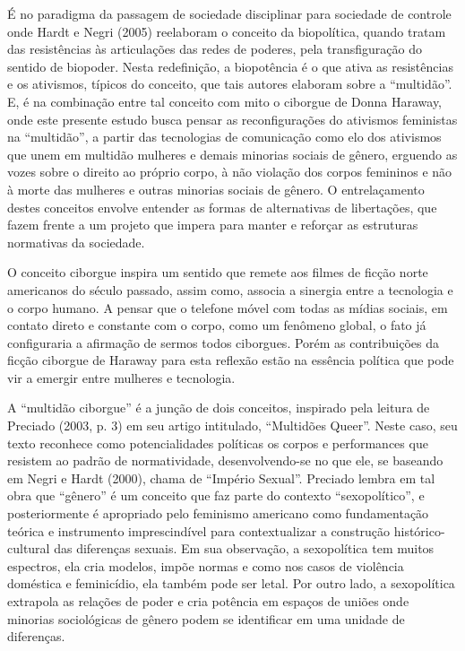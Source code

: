 É no paradigma da passagem de sociedade disciplinar para sociedade de
controle onde Hardt e Negri (2005) reelaboram o conceito da biopolítica,
quando tratam das resistências às articulações das redes de poderes,
pela transfiguração do sentido de biopoder. Nesta redefinição, a
biopotência é o que ativa as resistências e os ativismos, típicos do
conceito, que tais autores elaboram sobre a ``multidão''. E, é na
combinação entre tal conceito com mito o ciborgue de Donna Haraway, onde
este presente estudo busca pensar as reconfigurações do ativismos
feministas na ``multidão'', a partir das tecnologias de comunicação como
elo dos ativismos que unem em multidão mulheres e demais minorias
sociais de gênero, erguendo as vozes sobre o direito ao próprio corpo, à
não violação dos corpos femininos e não à morte das mulheres e outras
minorias sociais de gênero. O entrelaçamento destes conceitos envolve
entender as formas de alternativas de libertações, que fazem frente a um
projeto que impera para manter e reforçar as estruturas normativas da
sociedade.

O conceito ciborgue inspira um sentido que remete aos filmes de ficção
norte americanos do século passado, assim como, associa a sinergia entre
a tecnologia e o corpo humano. A pensar que o telefone móvel com todas
as mídias sociais, em contato direto e constante com o corpo, como um
fenômeno global, o fato já configuraria a afirmação de sermos todos
ciborgues. Porém as contribuições da ficção ciborgue de Haraway para
esta reflexão estão na essência política que pode vir a emergir entre
mulheres e tecnologia.

A ``multidão ciborgue'' é a junção de dois conceitos, inspirado pela
leitura de Preciado (2003, p. 3) em seu artigo intitulado, ``Multidões
Queer''. Neste caso, seu texto reconhece como potencialidades políticas
os corpos e performances que resistem ao padrão de normatividade,
desenvolvendo-se no que ele, se baseando em Negri e Hardt (2000), chama
de ``Império Sexual''. Preciado lembra em tal obra que ``gênero'' é um
conceito que faz parte do contexto ``sexopolítico'', e posteriormente é
apropriado pelo feminismo americano como fundamentação teórica e
instrumento imprescindível para contextualizar a construção
histórico-cultural das diferenças sexuais. Em sua observação, a
sexopolítica tem muitos espectros, ela cria modelos, impõe normas e como
nos casos de violência doméstica e feminicídio, ela também pode ser
letal. Por outro lado, a sexopolítica extrapola as relações de poder e
cria potência em espaços de uniões onde minorias sociológicas de gênero
podem se identificar em uma unidade de diferenças.

